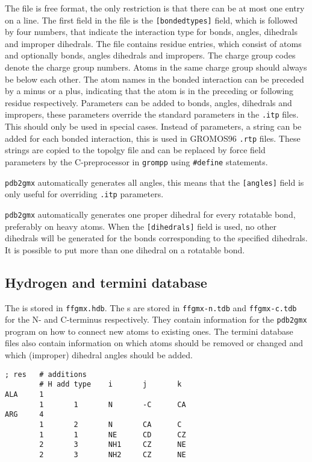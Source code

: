 The file is free format, the only restriction is that there can be at most
one entry on a line.
The first field in the file is the {\tt [bondedtypes]} field, which is
followed by four numbers, that indicate the interaction type for bonds,
angles, dihedrals and improper dihedrals.
The file contains residue entries, which consist of atoms and optionally 
bonds, angles dihedrals and impropers.
The charge group codes denote the charge group numbers.
Atoms in the same charge group should always be below each other.
The atom names in the bonded interaction can be preceded by a minus
or a plus, indicating that the atom is in the preceding or following
residue respectively.
Parameters can be added to bonds, angles, dihedrals and impropers,
these parameters override the standard parameters in the {\tt .itp} files.
This should only be used in special cases. Instead of parameters, a
string can be added for each bonded interaction, this is used in
GROMOS96 {\tt .rtp} files. These strings are copied to the topolgy file
and can be replaced by force field parameters by the C-preprocessor in
{\tt grompp} using {\tt \#define} statements.

{\tt pdb2gmx} automatically generates all angles, this means that the
{\tt [angles]} field is only useful for overriding {\tt .itp} parameters. 

{\tt pdb2gmx} automatically generates one proper dihedral for every rotatable
bond, preferably on heavy atoms. When the {\tt [dihedrals]} field is used,
no other dihedrals will be generated for the bonds corresponding to the
specified  dihedrals. It is possible to put more than one dihedral on a
rotatable bond. 

\subsection{Hydrogen and termini database}
The  is stored in {\tt ffgmx.hdb}.
The s are stored in {\tt ffgmx-n.tdb}
and {\tt ffgmx-c.tdb} for the N- and C-terminus respectively.
They contain information for the {\tt pdb2gmx} program on how to connect
new atoms to existing ones. The termini database files also contain
information on which atoms should be removed or changed and which
(improper) dihedral angles should be added.

{\small\begin{verbatim}
; res   # additions
        # H add type    i       j       k
ALA     1
        1       1       N       -C      CA
ARG     4
        1       2       N       CA      C
        1       1       NE      CD      CZ
        2       3       NH1     CZ      NE
        2       3       NH2     CZ      NE
\end{verbatim}
}


